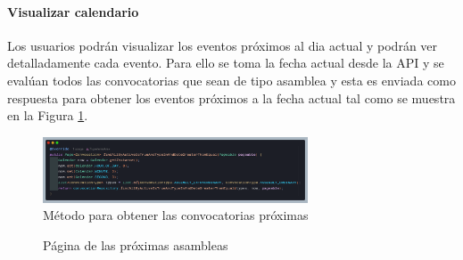 \paragraph{Visualizar calendario}

Los usuarios podrán visualizar los eventos próximos al dia actual y podrán ver detalladamente cada evento.
Para ello se toma la fecha actual desde la API y se evalúan todos las convocatorias que sean de tipo asamblea y esta es enviada como respuesta para obtener los eventos próximos a la fecha actual tal como se muestra en la Figura \ref{fig:api-event-filter}.

\begin{figure}[H]
    \centering
    \includegraphics[width=0.7\textwidth]{resources/images/api-calendar}
    \caption{Método para obtener las convocatorias próximas}
    \label{fig:api-event-filter}
\end{figure}

\begin{figure}[H]
    \centering
    \caption{Página de las próximas asambleas}
    \label{fig:app-events}
\end{figure}

